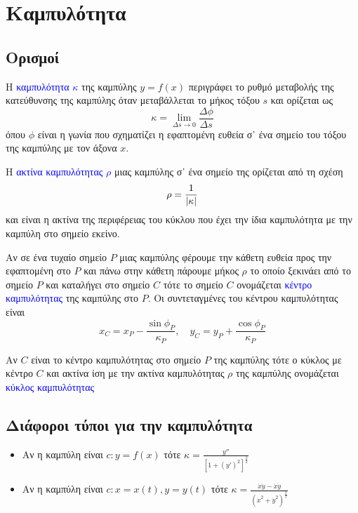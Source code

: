 



\everymath{\displaystyle}





\chapter{Καμπυλότητα}

\section{Ορισμοί}


\begin{dfn}
	Η \textcolor{blue}{καμπυλότητα $\kappa$} της καμπύλης $ y = f(x) $ περιγράφει
	το ρυθμό μεταβολής της κατεύθυνσης της καμπύλης όταν μεταβάλλεται το μήκος
	τόξου $s$ και ορίζεται ως 
	\[
		\kappa = \lim_{\Delta s\to 0} \frac{\Delta \phi}{\Delta s} 
	\] 
	όπου $\phi$ είναι η γωνία που σχηματίζει η εφαπτομένη ευθεία σ᾽ ένα σημείο
	του τόξου της καμπύλης με τον άξονα $x$. 
\end{dfn}

\begin{dfn}
	Η \textcolor{blue}{ακτίνα καμπυλότητας $\rho$} μιας καμπύλης σ᾽ ένα σημείο
	της ορίζεται από τη σχέση 
	\[
		\rho = \frac{1}{\abs{\kappa}} 
	\] 
	και είναι η ακτίνα της περιφέρειας του κύκλου που έχει την ίδια καμπυλότητα
	με την καμπύλη στο σημείο εκείνο.
\end{dfn}

\begin{dfn}
	Αν σε ένα τυχαίο σημείο $P$ μιας καμπύλης φέρουμε την κάθετη ευθεία  προς την
	εφαπτομένη στο $P$ και πάνω στην κάθετη πάρουμε μήκος $\rho$ το οποίο
	ξεκινάει από το σημείο $P$ και καταλήγει στο σημείο $C$ τότε το σημείο $C$
	ονομάζεται \textcolor{blue}{κέντρο καμπυλότητας} της καμπύλης στο $P$.
	Οι συντεταγμένες του κέντρου καμπυλότητας είναι
	\[
		x_{C} = x_{P} - \frac{\sin{\phi_{P}}}{\kappa_{P}}, \quad y_{C} = y_{P} +
		\frac{\cos{\phi_{P}}}{\kappa_{P}} 
	\] 
\end{dfn}

\begin{dfn}
	Αν $C$ είναι το κέντρο καμπυλότητας στο σημείο $P$ της καμπύλης τότε ο
	κύκλος με κέντρο $C$ και ακτίνα ίση με την ακτίνα καμπυλότητας $\rho$ της
	καμπύλης ονομάζεται \textcolor{blue}{κύκλος καμπυλότητας}
\end{dfn}

\section{Διάφοροι τύποι για την καμπυλότητα}

\begin{itemize}
	\item Αν η καμπύλη είναι $c: y = f(x) $ τότε $ \kappa = \frac{y''}{[1 +
			(y')^{2}]^{\frac{3}{2}}} $
		\item Αν η καμπύλη είναι $ c: x = x(t), y = y(t) $ τότε $ \kappa =
			\frac{\dot{x}\ddot{y} - \ddot{x}\dot{y}}{(\dot{x}^{2} +
			\dot{y}^{2})^{\frac{3}{2}}}$
\end{itemize}




